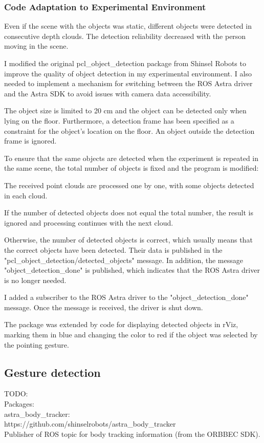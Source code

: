 \subsubsection{Code Adaptation to Experimental Environment}
Even if the scene with the objects was static, different objects were detected in consecutive depth clouds. The detection reliability decreased with the person moving in the scene.\par
I modified the original pcl\_object\_detection package from Shinsel Robots to improve the quality of object detection in my experimental environment. I also needed to implement a mechanism for switching between the ROS Astra driver and the Astra SDK to avoid issues with camera data accessibility.\par
The object size is limited to 20 cm and the object can be detected only when lying on the floor. Furthermore, a detection frame has been specified as a constraint for the object's location on the floor. An object outside the detection frame is ignored.\par
To ensure that the same objects are detected when the experiment is repeated in the same scene, the total number of objects is fixed and the program is modified:\par
The received point clouds are processed one by one, with some objects detected in each cloud. \par
If the number of detected objects does not equal the total number, the result is ignored and processing continues with the next cloud.\par
Otherwise, the number of detected objects is correct, which usually means that the correct objects have been detected. Their data is published in the "pcl\_object\_detection/detected\_objects" message. In addition, the message "object\_detection\_done" is published, which indicates that the ROS Astra driver is no longer needed.\par 
I added a subscriber to the ROS Astra driver to the "object\_detection\_done" message. Once the message is received, the driver is shut down.\par

The package was extended by code for displaying detected objects in rViz, marking them in blue and changing the color to red if the object was selected by the  pointing gesture.\par

\subsection{Gesture detection}
TODO:\\
Packages: \\
astra\_body\_tracker:\\
https://github.com/shinselrobots/astra\_body\_tracker\\
Publisher of ROS topic for body tracking information (from the ORBBEC SDK).\\

